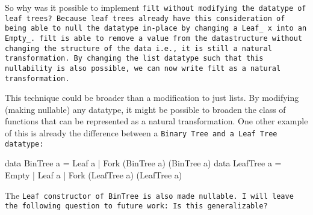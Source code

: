 So why was it possible to implement \tt{filt} without modifying the datatype of leaf trees?
Because leaf trees already have this consideration of being able to null the datatype in-place by changing a \tt{Leaf\_ x} into an \tt{Empty\_}.
\tt{filt} is able to remove a value from the datastructure without changing the structure of the data i.e., it is still a natural transformation.
By changing the list datatype such that this nullability is also possible, we can now write \tt{filt} as a natural transformation.

This technique could be broader than a modification to just lists.
By modifying (making nullable) any datatype, it might be possible to broaden the class of functions that can be represented as a natural transformation.
One other example of this is already the difference between a \tt{Binary Tree} and a \tt{Leaf Tree} datatype:
\begin{spec}
data BinTree a = Leaf a | Fork (BinTree a) (BinTree a)
data LeafTree a = Empty | Leaf a | Fork (LeafTree a) (LeafTree a)
\end{spec}
The \tt{Leaf} constructor of \tt{BinTree} is also made nullable.
I will leave the following question to future work: Is this generalizable?






